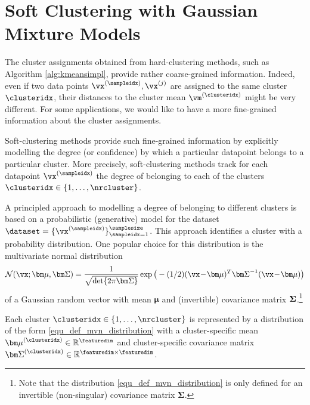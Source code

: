 \documentclass[12pt]{report}
\begin{document}
\section{Soft Clustering with Gaussian Mixture Models}
\label{sec_soft_clustering}

The cluster assignments obtained from hard-clustering 
methods, such as Algorithm \ref{alg:kmeansimpl}, provide 
rather coarse-grained information. Indeed, even if two data 
points $\vx^{(\sampleidx)}, \vx^{(j)}$ are assigned to the 
same cluster $\clusteridx$, their distances to the cluster mean $\vm^{(\clusteridx)}$ 
might be very different. For some applications, we would 
like to have a more fine-grained information about the cluster 
assignments. 

Soft-clustering methods provide such fine-grained information 
by explicitly modelling the degree (or confidence) by which 
a particular datapoint belongs to a particular cluster. More 
precisely, soft-clustering methods track for each datapoint 
$\vx^{(\sampleidx)}$ the degree of belonging to each of the 
clusters $\clusteridx \in \{1,\ldots,\nrcluster\}$.  

A principled approach to modelling a degree of belonging to 
different clusters is based on a probabilistic (generative) model 
for the dataset $\dataset = \{ \vx^{(\sampleidx)} \}_{\sampleidx=1}^{\samplesize}$. 
This approach identifies a cluster with a probability distribution. 
One popular choice for this distribution is the multivariate normal 
distribution 
\begin{equation}
\label{equ_def_mvn_distribution}
 \mathcal{N} (\vx ; {\bm \mu}, {\bm \Sigma}) = \frac{1}{\sqrt{{\rm det } \{ 2 \pi  {\bm \Sigma} \} }} \exp\big( - (1/2) (\vx\!-\!{\bm \mu})^{T}  {\bm \Sigma}^{-1} (\vx\!-\!{\bm \mu})  \big)
\end{equation} 
of a Gaussian random vector with mean ${\bm \mu}$ and (invertible) covariance 
matrix ${\bf \Sigma}$.\footnote{Note that the distribution \eqref{equ_def_mvn_distribution} 
is only defined for an invertible (non-singular) covariance matrix ${\bm \Sigma}$.}

Each cluster $\clusteridx \in \{1,\ldots,\nrcluster\}$ is represented by a distribution 
of the form \eqref{equ_def_mvn_distribution} with a cluster-specific mean 
${\bm \mu}^{(\clusteridx)} \in \mathbb{R}^{\featuredim}$ and cluster-specific 
covariance matrix ${\bm \Sigma}^{(\clusteridx)} \in \mathbb{R}^{\featuredim \times \featuredim}$. 
\end{document}
